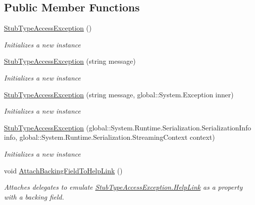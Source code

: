 \subsection*{Public Member Functions}
\begin{DoxyCompactItemize}
\item 
\hyperlink{class_system_1_1_fakes_1_1_stub_type_access_exception_a41613c63c43ddb230821a68b3f891857}{Stub\-Type\-Access\-Exception} ()
\begin{DoxyCompactList}\small\item\em Initializes a new instance\end{DoxyCompactList}\item 
\hyperlink{class_system_1_1_fakes_1_1_stub_type_access_exception_a897e061c2160de4c9848f702c59da7bb}{Stub\-Type\-Access\-Exception} (string message)
\begin{DoxyCompactList}\small\item\em Initializes a new instance\end{DoxyCompactList}\item 
\hyperlink{class_system_1_1_fakes_1_1_stub_type_access_exception_a6a056a8d6a1ea07b5eacc501e1c5392d}{Stub\-Type\-Access\-Exception} (string message, global\-::\-System.\-Exception inner)
\begin{DoxyCompactList}\small\item\em Initializes a new instance\end{DoxyCompactList}\item 
\hyperlink{class_system_1_1_fakes_1_1_stub_type_access_exception_a2b80c75fa39f70692148def3bfdc4669}{Stub\-Type\-Access\-Exception} (global\-::\-System.\-Runtime.\-Serialization.\-Serialization\-Info info, global\-::\-System.\-Runtime.\-Serialization.\-Streaming\-Context context)
\begin{DoxyCompactList}\small\item\em Initializes a new instance\end{DoxyCompactList}\item 
void \hyperlink{class_system_1_1_fakes_1_1_stub_type_access_exception_ae61012fc5f1902289db4c90d3d90f0a6}{Attach\-Backing\-Field\-To\-Help\-Link} ()
\begin{DoxyCompactList}\small\item\em Attaches delegates to emulate \hyperlink{class_system_1_1_fakes_1_1_stub_type_access_exception_ae9d2d21f7496518f16641ac92fcc4d70}{Stub\-Type\-Access\-Exception.\-Help\-Link} as a property with a backing field.\end{DoxyCompactList}\item 

\end{DoxyCompactItemize}
